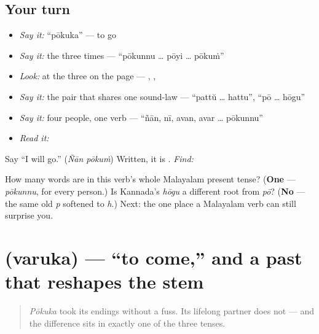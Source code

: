 \subsection*{Your turn}
\begin{itemize}
\raggedright
  \item \emph{Say it:} \textquotedblleft{}pōkuka\textquotedblright{} — to go
  \item \emph{Say it:} the three times — \textquotedblleft{}pōkunnu … pōyi … pōkuṁ\textquotedblright{}
  \item \emph{Look:} at the three on the page — \textbf{}, \textbf{}, \textbf{}
  \item \emph{Say it:} the pair that shares one sound-law — \textquotedblleft{}pattŭ … hattu\textquotedblright{}, \textquotedblleft{}pō … hōgu\textquotedblright{}
  \item \emph{Say it:} four people, one verb — \textquotedblleft{}ñān, nī, avan, avar … pōkunnu\textquotedblright{}
  \item \emph{Read it:} \textbf{}
\end{itemize}

\begin{tcolorbox}[breakable,colback=teal!4,colframe=teal!35!black,title={Before you move on}]
Say \textquotedblleft{}I will go.\textquotedblright{} (\emph{Ñān pōkuṁ}) Written, it is \textbf{ }. \emph{Find:} \textbf{ }

How many words are in this verb's whole Malayalam present tense? (\textbf{One} — \emph{pōkunnu}, for every person.) Is Kannada's \emph{hōgu} a different root from \emph{pō}? (\textbf{No} — the same old \emph{p} softened to \emph{h}.) Next: the one place a Malayalam verb can still surprise you.
\end{tcolorbox}
\section[\texorpdfstring{\ml{വരുക} (varuka)}{വരുക (varuka)}]{ (varuka) — \textquotedblleft{}to come,\textquotedblright{} and a past that reshapes the stem}

\label{lesson:ML-C32-varuka}



\begin{quote}
\emph{Pōkuka} took its endings without a fuss. Its lifelong partner does not — and the difference sits in exactly one of the three tenses.
\end{quote}

